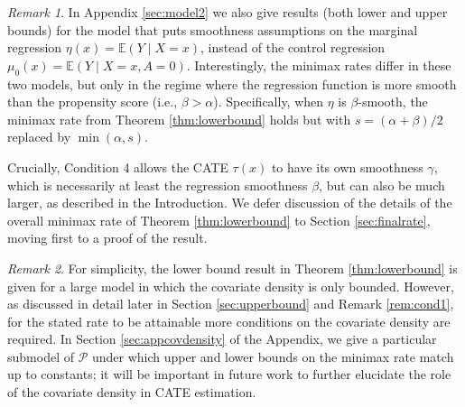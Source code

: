 \documentclass[11pt,twoside]{article}
\newcommand{\E}{\mathbb{E}}
\theoremstyle{definition}
\theoremstyle{remark}
\newtheorem{remark}{Remark}
\begin{document}
\bigskip

\begin{remark}
In Appendix \ref{sec:model2} we also give results (both lower and upper bounds) for the model that puts smoothness assumptions on the marginal regression $\eta(x)=\E(Y \mid X=x)$, instead of the control regression $\mu_0(x)=\E(Y \mid X=x,A=0)$. Interestingly, the minimax rates differ in these two models, but only in the regime  where the regression function is more smooth than the propensity score (i.e., $\beta > \alpha$). Specifically, when $\eta$ is $\beta$-smooth, the minimax rate from Theorem \ref{thm:lowerbound} holds but with $s=(\alpha+\beta)/2$ replaced by $\min(\alpha,s)$.  \\
\end{remark}

Crucially, Condition 4 allows the CATE $\tau(x)$ to have its own smoothness  $\gamma$, which is necessarily at least the regression smoothness $\beta$, but can also be much larger, as described in the Introduction.  
We defer discussion of the details of the overall minimax rate of Theorem \ref{thm:lowerbound} to Section \ref{sec:finalrate}, moving first to a proof of the result.  \\

\begin{remark}
For simplicity,  the lower bound result in Theorem \ref{thm:lowerbound} is given for a large model in which the covariate density is only bounded. However,  as discussed in detail later in Section \ref{sec:upperbound} and Remark \ref{rem:cond1}, for the stated rate to be attainable more conditions on the covariate density are required. In Section \ref{sec:appcovdensity} of the Appendix, we give a particular submodel of $\mathcal{P}$ under which upper and lower bounds on the minimax rate match up to constants; it will be important in future work to further elucidate the role of the covariate density in CATE estimation.\\
\end{remark}
\end{document}
